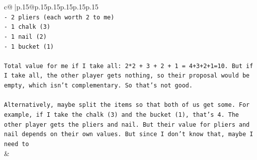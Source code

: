\documentclass{article}
\begin{document}
{\begin{supertabular}{c@{$\;$}|p{.15\linewidth}@{}p{.15\linewidth}p{.15\linewidth}p{.15\linewidth}p{.15\linewidth}p{.15\linewidth}}
{{{\\ 
\texttt{{-} 2 pliers (each worth 2 to me)} \\
\texttt{{-} 1 chalk (3)} \\
\texttt{{-} 1 nail (2)} \\
\texttt{{-} 1 bucket (1)} \\
\\ 
\texttt{Total value for me if I take all: 2*2 + 3 + 2 + 1 = 4+3+2+1=10. But if I take all, the other player gets nothing, so their proposal would be empty, which isn't complementary. So that's not good.} \\
\\ 
\texttt{Alternatively, maybe split the items so that both of us get some. For example, if I take the chalk (3) and the bucket (1), that's 4. The other player gets the pliers and nail. But their value for pliers and nail depends on their own values. But since I don't know that, maybe I need to} \\
            }
        }
    }
    & \\ \\


\end{supertabular}}
\end{document}

